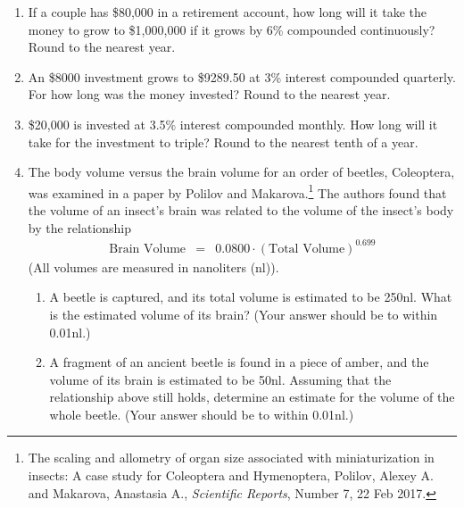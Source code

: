 \begin{enumerate}
\clearpage

\item If a couple has \$80,000 in a retirement account, how long will it take the money to grow to \$1,000,000 if it grows by 6\% compounded continuously?  Round to the nearest year.\vfill

\item An \$8000 investment grows to \$9289.50 at 3\% interest compounded quarterly.  For how long was the money invested?  Round to the nearest year.\vfill

\item \$20,000 is invested at 3.5\% interest compounded monthly.  How long will it take for the investment to triple?  Round to the nearest tenth of a year.
\vfill
\vfill

\clearpage

\item The body volume versus the brain volume for an order of beetles,
  Coleoptera, was examined in a paper by Polilov and
  Makarova.\footnote{The scaling and allometry of organ size
    associated with miniaturization in insects: A case study for
    Coleoptera and Hymenoptera, Polilov, Alexey A. and Makarova,
    Anastasia A., \textit{Scientific Reports}, Number 7, 22 Feb 2017.}
  The authors found that the volume of an insect's brain was related
  to the volume of the insect's body by the relationship
  \begin{eqnarray*}
    \textrm{Brain Volume} & = & 0.0800 \cdot \left( \textrm{Total Volume} \right)^{0.699}
  \end{eqnarray*}
  (All volumes are measured in nanoliters (nl)).
  \begin{enumerate}
  \item A beetle is captured, and its total volume is estimated to be
    250nl. What is the estimated volume of its brain? (Your answer
    should be to within 0.01nl.)
      
    \vfill
    
  \item A fragment of an ancient beetle is found in a piece of amber,
    and the volume of its brain is estimated to be 50nl. Assuming that
    the relationship above still holds, determine an estimate for the
    volume of the whole beetle.  (Your answer should be to within
    0.01nl.)

    \vfill
    
  \end{enumerate}

  \clearpage


\end{enumerate}
